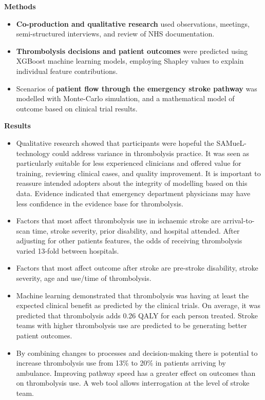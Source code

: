 \textbf{Methods}

\begin{itemize}

    \item \textbf{Co-production and qualitative research} used observations, meetings, semi-structured interviews, and review of NHS documentation.

    \item \textbf{Thrombolysis decisions and patient outcomes} were predicted using XGBoost machine learning models, employing Shapley values to explain individual feature contributions.

    \item Scenarios of \textbf{patient flow through the emergency stroke pathway} was modelled with Monte-Carlo simulation, and a mathematical model of outcome based on clinical trial results.
    
\end{itemize}

\textbf{Results}

\begin{itemize}

    \item Qualitative research showed that participants were hopeful the SAMueL-technology could address variance in thrombolysis practice. It was seen as particularly suitable for less experienced clinicians and offered value for training, reviewing clinical cases, and quality improvement. It is important to reassure intended adopters about the integrity of modelling based on this data. Evidence indicated that emergency department physicians may have less confidence in the evidence base for thrombolysis.
    
    \item Factors that most affect thrombolysis use in ischaemic stroke are arrival-to-scan time, stroke severity, prior disability, and hospital attended. After adjusting for other patients features, the odds of receiving thrombolysis varied 13-fold between hospitals.

    \item Factors that most affect outcome after stroke are pre-stroke disability, stroke severity, age and use/time of thrombolysis.
    
    \item Machine learning demonstrated that thrombolysis was having at least the expected clinical benefit as predicted by the clinical trials. On average, it was predicted that thrombolysis adds 0.26 QALY for each person treated. Stroke teams with higher thrombolysis use are predicted to be generating better patient outcomes.

    \item By combining changes to processes and decision-making there is potential to increase thrombolysis use from 13\% to 20\% in patients arriving by ambulance. Improving pathway speed has a greater effect on outcomes than on thrombolysis use. A web tool allows interrogation at the level of stroke team.
\end{itemize}

